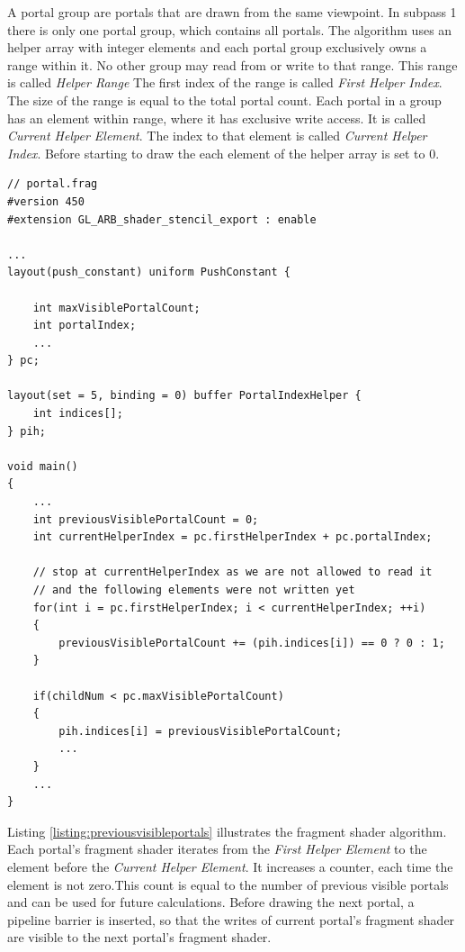 A portal group are portals that are drawn from the same viewpoint. In subpass 1 there is only one portal group, which contains all portals. The algorithm uses an helper array with integer elements and each portal group exclusively owns a range within it. No other group may read from or write to that range. This range is called \textit{Helper Range} The first index of the range is called \textit{First Helper Index}. The size of the range is equal to the total portal count. Each portal in a group has an element within range, where it has exclusive write access. It is called \textit{Current Helper Element}. The index to that element is called \textit{Current Helper Index}. Before starting to draw the each element of the helper array is set to 0.

\begin{lstlisting}[caption={Calculate Previous Visible Portals}, label=listing:previousvisibleportals]
// portal.frag
#version 450
#extension GL_ARB_shader_stencil_export : enable

...
layout(push_constant) uniform PushConstant {	

	int maxVisiblePortalCount;
	int portalIndex;
	...
} pc;

layout(set = 5, binding = 0) buffer PortalIndexHelper {
	int indices[];
} pih;

void main()
{
	...
	int previousVisiblePortalCount = 0;
	int currentHelperIndex = pc.firstHelperIndex + pc.portalIndex;
	
	// stop at currentHelperIndex as we are not allowed to read it
	// and the following elements were not written yet
	for(int i = pc.firstHelperIndex; i < currentHelperIndex; ++i)
	{
		previousVisiblePortalCount += (pih.indices[i]) == 0 ? 0 : 1;
	}
	
	if(childNum < pc.maxVisiblePortalCount)
	{
		pih.indices[i] = previousVisiblePortalCount;
		...
	}
	...
}
\end{lstlisting}

Listing \ref{listing:previousvisibleportals} illustrates the fragment shader algorithm. Each portal's fragment shader iterates from the \textit{First Helper Element} to the element before the \textit{Current Helper Element}. It increases a counter, each time the element is not zero.This count is equal to the number of previous visible portals and can be used for future calculations. Before drawing the next portal, a pipeline barrier is inserted, so that the writes of current portal's fragment shader are visible to the next portal's fragment shader.

